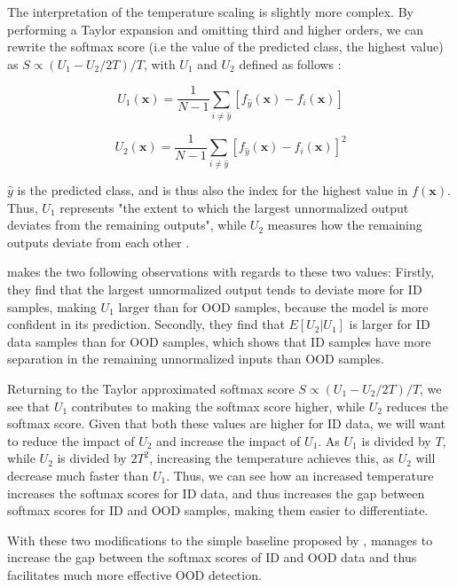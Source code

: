 \documentclass[conference,onecolumn]{IEEEtran}
\begin{document}
The interpretation of the temperature scaling is slightly more complex. By performing a Taylor expansion and omitting third and higher orders, we can rewrite the softmax score (i.e the value of the predicted class, the highest value) as ${S\propto {(U_{1}-U_{2}/2T)/T}}$, with $U_1$ and $U_2$ defined as follows \cite[4]{odin}:


\begin{equation}\label{eq::u1u2}
U_{1}(\bm{x})=\frac{1}{N-1}\sum_{i\neq\hat{y}}[f_{\hat{y}}(\bm{x})-f_{i}(\bm{x})]
\end{equation}

\begin{equation}\label{eq::u1u2}
U_{2}(\bm{x})=\frac{1}{N-1}\sum_{i\neq\hat{y}}[f_{\hat{y}}(\bm{x})-f_{i}(\bm{x})]^{2}
\end{equation}

$\hat{y}$ is the predicted class, and is thus also the index for the highest value in $f(\bm{x})$. Thus, $U_1$ represents "the extent to which the largest unnormalized output deviates from the remaining outputs", while $U_2$ measures how the remaining outputs deviate from each other \cite[6]{odin}.

\cite{odin} makes the two following observations with regards to these two values: Firstly, they find that the largest unnormalized output tends to deviate more for ID samples, making $U_1$ larger than for OOD samples, because the model is more confident in its prediction. Secondly, they find that $E[U_2|U_1]$ is larger for ID data samples than for OOD samples, which shows that ID samples have more separation in the remaining unnormalized inputs than OOD samples. 

Returning to the Taylor approximated softmax score ${S\propto {(U_{1}-U_{2}/2T)/T}}$, we see that $U_1$ contributes to making the softmax score higher, while $U_2$ reduces the softmax score. Given that both these values are higher for ID data, we will want to reduce the impact of $U_2$ and increase the impact of $U_1$. As $U_1$ is divided by $T$, while $U_2$ is divided by $2T^2$, increasing the temperature achieves this, as $U_2$ will decrease much faster than $U_1$. Thus, we can see how an increased temperature increases the softmax scores for ID data, and thus increases the gap between softmax scores for ID and OOD samples, making them easier to differentiate.

With these two modifications to the simple baseline proposed by \cite{oodbaseline}, \cite{odin} manages to increase the gap between the softmax scores of ID and OOD data and thus facilitates much more effective OOD detection.
\\
\end{document}
